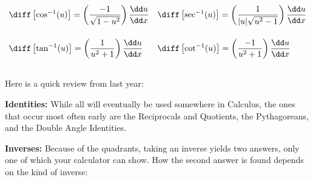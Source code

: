 \begin{center}
{{\begin{minipage}{0.96\textwidth}
\begin{align*}
            & \diff\left[\cos^{-1} (u)\right] = \left(\dfrac{-1}{\sqrt{1 - u^2}} \right) \dfrac{\dd u}{\dd x} && \diff\left[\sec^{-1} (u)\right] = \left(\dfrac{1}{|u|\sqrt{u^2 - 1}}\right) \dfrac{\dd u}{\dd x} \\[11pt] %
            & \diff\left[\tan^{-1} (u)\right] = \left(\dfrac{1}{u^2+ 1} \right) \dfrac{\dd u}{\dd x} && \diff\left[\cot^{-1} (u)\right] = \left(\dfrac{-1}{u^2 + 1}\right) \dfrac{\dd u}{\dd x} \\[11pt] %
        \end{align*}
    \end{minipage}}}
\end{center}

Here is a quick review from last year: \par

\textbf{Identities: } While all will eventually be used somewhere in Calculus, the ones that occur most often early are the Reciprocals and Quotients, the Pythagoreans, and the Double Angle Identities. 

\begin{center}
\end{center}

\textbf{Inverses: } Because of the quadrants, taking an inverse yields two answers, only one of which your calculator can show.  How the second answer is found depends on the kind of inverse: 


